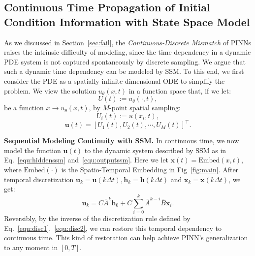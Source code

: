\vspace{-2mm}


\subsection{Continuous Time Propagation of Initial Condition Information with State Space Model}
\vspace{-1mm}
\label{sec:ssm}
As we discussed in Section~\ref{sec:fail}, the \textit{Continuous-Discrete Mismatch} of PINNs raises the intrinsic difficulty of modeling, since the time dependency in a dynamic PDE system is not captured spontaneously by discrete sampling. 
    We argue that such a dynamic time dependency can be modeled by SSM. 
To this end, we first consider the PDE as a spatially infinite-dimensional ODE to simplify the problem. We view the solution $u_\theta(x,t)$ in a function space that, if we let:
\begin{equation}
    U(t) := u_\theta(\cdot,t),
\end{equation}
be a function $x \to u_\theta(x,t)$, by $M$-point spatial sampling:
\begin{equation}
    U_i(t) := u(x_i,t),
\end{equation}
\begin{equation}
    \mathbf {u}(t) = \left[U_1(t),U_2(t),\cdots,U_M(t) \right]^\top .
    \label{}
\end{equation}

\textbf{Sequential Modeling Continuity with SSM.}
In continuous time, we now model the function $\mathbf {u}(t)$ to the dynamic system described by SSM as in Eq.~\ref{equ:hiddenssm} and~\ref{equ:outputssm}. Here we let $\mathbf x(t) = \text{Embed}(x,t)$, where $\text{Embed}(\cdot)$ is the Spatio-Temporal Embedding in Fig~\ref{fig:main}. After temporal discretization $\mathbf u_k=\mathbf u(k\Delta t),\mathbf h_k=\mathbf h(k\Delta t)$ and $\mathbf x_k=\mathbf x(k\Delta t)$, we get: 
\begin{equation}
    \mathbf u_k=C\bar A^k \mathbf h_0 + C\sum_{i=0}^k\bar A^{k-i}\bar B\mathbf x_i.
    \label{equ:ssmu}
\end{equation}
Reversibly, by the inverse of the discretization rule defined by Eq.~\ref{equ:disc1},~\ref{equ:disc2}, we can restore this temporal dependency to continuous time. This kind of restoration can help achieve PINN's generalization to any moment in $[0, T]$. 

